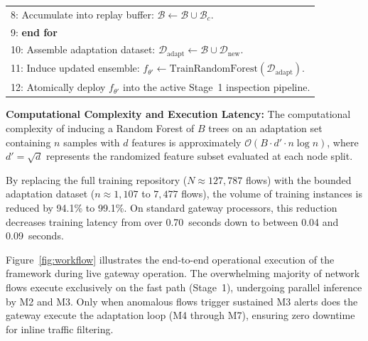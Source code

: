 \begin{table}[htpb]
\begin{tabular}{|p{13.5cm}|}
8: \hspace{0.5cm} Accumulate into replay buffer: $\mathcal{B} \leftarrow \mathcal{B} \cup \mathcal{B}_c$. \\
9: \textbf{end for} \\
10: Assemble adaptation dataset: $\mathcal{D}_{\text{adapt}} \leftarrow \mathcal{B} \cup \mathcal{D}_{\text{new}}$. \\
11: Induce updated ensemble: $f_{\theta'} \leftarrow \text{TrainRandomForest}(\mathcal{D}_{\text{adapt}})$. \\
12: Atomically deploy $f_{\theta'}$ into the active Stage~1 inspection pipeline. \\ \hline
\end{tabular}
\end{table}

\textbf{Computational Complexity and Execution Latency:} The computational complexity of inducing a Random Forest of $B$ trees on an adaptation set containing $n$ samples with $d$ features is approximately $\mathcal{O}(B \cdot d' \cdot n \log n)$, where $d' = \sqrt{d}$ represents the randomized feature subset evaluated at each node split. 

By replacing the full training repository ($N \approx 127{,}787$ flows) with the bounded adaptation dataset ($n \approx 1{,}107$ to $7{,}477$ flows), the volume of training instances is reduced by 94.1\% to 99.1\%. On standard gateway processors, this reduction decreases training latency from over 0.70~seconds down to between 0.04 and 0.09~seconds.

Figure~\ref{fig:workflow} illustrates the end-to-end operational execution of the framework during live gateway operation. The overwhelming majority of network flows execute exclusively on the fast path (Stage~1), undergoing parallel inference by M2 and M3. Only when anomalous flows trigger sustained M3 alerts does the gateway execute the adaptation loop (M4 through M7), ensuring zero downtime for inline traffic filtering.

